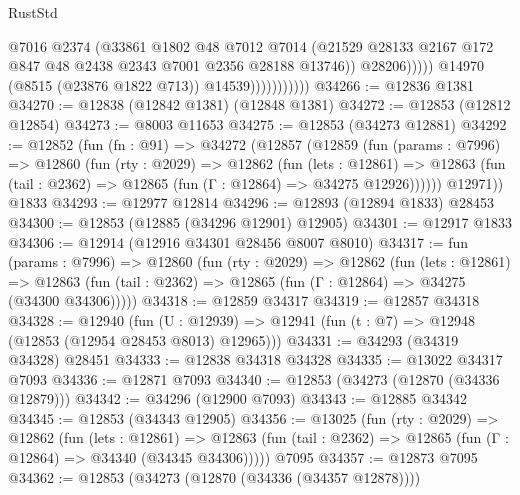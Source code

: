 \begin{lexlean}{RustStd}
\begin{coremodule}
                                    @7016
                                    @2374
                                    (@33861
                                      @1802
                                      @48
                                      @7012
                                      @7014
                                      (@21529
                                        @28133
                                        @2167
                                        @172
                                        @847
                                        @48
                                        @2438
                                        @2343
                                        @7001
                                        @2356
                                        @28188
                                        @13746))
                                    @28206)))))
                          @14970
                          (@8515 (@23876 @1822 @713))
                          @14539)))))))))))
@34266 := @12836 @1381
@34270 := @12838 (@12842 @1381) (@12848 @1381)
@34272 := @12853 (@12812 @12854)
@34273 := @8003 @11653
@34275 := @12853 (@34273 @12881)
@34292 := @12852
    (fun (fn : @91) =>
    @34272
      (@12857
        (@12859
          (fun (params : @7996) =>
          @12860
            (fun (rty : @2029) =>
            @12862
              (fun (lets : @12861) =>
              @12863 (fun (tail : @2362) => @12865 (fun (Γ : @12864) => @34275 @12926))))))
        @12971))
    @1833
@34293 := @12977 @12814
@34296 := @12893 (@12894 @1833) @28453
@34300 := @12853 (@12885 (@34296 @12901) @12905)
@34301 := @12917 @1833
@34306 := @12914 (@12916 @34301 @28456 @8007 @8010)
@34317 := fun (params : @7996) =>
  @12860
    (fun (rty : @2029) =>
    @12862
      (fun (lets : @12861) =>
      @12863 (fun (tail : @2362) => @12865 (fun (Γ : @12864) => @34275 (@34300 @34306)))))
@34318 := @12859 @34317
@34319 := @12857 @34318
@34328 := @12940
    (fun (U : @12939) => @12941 (fun (t : @7) => @12948 (@12853 (@12954 @28453 @8013) @12965)))
@34331 := @34293 (@34319 @34328) @28451
@34333 := @12838 @34318 @34328
@34335 := @13022 @34317 @7093
@34336 := @12871 @7093
@34340 := @12853 (@34273 (@12870 (@34336 @12879)))
@34342 := @34296 (@12900 @7093)
@34343 := @12885 @34342
@34345 := @12853 (@34343 @12905)
@34356 := @13025
    (fun (rty : @2029) =>
    @12862
      (fun (lets : @12861) =>
      @12863 (fun (tail : @2362) => @12865 (fun (Γ : @12864) => @34340 (@34345 @34306)))))
    @7095
@34357 := @12873 @7095
@34362 := @12853 (@34273 (@12870 (@34336 (@34357 @12878))))

\end{coremodule}
\end{lexlean}
